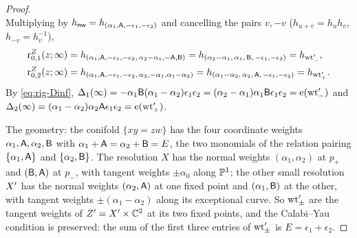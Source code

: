 \begin{proof}
\[\]
Multiplying by $h_{\mathsf{nw}}=h_{(\alpha_1,\mathsf{A},-\epsilon_1,-\epsilon_2)}$ and cancelling the pairs $v,-v$ ($h_{u+v}=h_uh_v$, $h_{-v}=h_v^{-1}$),
\begin{align*}
\mathrm{r}^{Z}_{0,1}(z;\infty)&=h_{(\alpha_1,\mathsf{A},-\epsilon_1,-\epsilon_2,\,\alpha_2-\alpha_1,-\mathsf{A},\mathsf{B})}=h_{(\alpha_2-\alpha_1,\,\alpha_1,\,\mathsf{B},\,-\epsilon_1,-\epsilon_2)}=h_{\mathrm{wt}'_-},\\
\mathrm{r}^{Z}_{0,2}(z;\infty)&=h_{(\alpha_1,\mathsf{A},-\epsilon_1,-\epsilon_2,\,\alpha_2,-\alpha_1,\alpha_1-\alpha_2)}=h_{(\alpha_1-\alpha_2,\,\alpha_2,\,\mathsf{A},\,-\epsilon_1,-\epsilon_2)}=h_{\mathrm{wt}'_+}.
\end{align*}
By \eqref{eq:rig-Dinf}, $\Delta_1(\infty)=-\alpha_1\mathsf{B}(\alpha_1-\alpha_2)\epsilon_1\epsilon_2=(\alpha_2-\alpha_1)\alpha_1\mathsf{B}\epsilon_1\epsilon_2=\mathrm{e}(\mathrm{wt}'_-)$ and $\Delta_2(\infty)=(\alpha_1-\alpha_2)\alpha_2\mathsf{A}\epsilon_1\epsilon_2=\mathrm{e}(\mathrm{wt}'_+)$.

The geometry: the conifold $\{xy=zw\}$ has the four coordinate weights $\alpha_1,\mathsf{A},\alpha_2,\mathsf{B}$ with $\alpha_1+\mathsf{A}=\alpha_2+\mathsf{B}=E$, the two monomials of the relation pairing $\{\alpha_1,\mathsf{A}\}$ and $\{\alpha_2,\mathsf{B}\}$. The resolution $X$ has the normal weights $(\alpha_1,\alpha_2)$ at $p_+$ and $(\mathsf{B},\mathsf{A})$ at $p_-$, with tangent weights $\pm\alpha_0$ along $\mathbb{P}^1$; the other small resolution $X'$ has the normal weights $(\alpha_2,\mathsf{A})$ at one fixed point and $(\alpha_1,\mathsf{B})$ at the other, with tangent weights $\pm(\alpha_1-\alpha_2)$ along its exceptional curve. So $\mathrm{wt}'_\pm$ are the tangent weights of $Z'=X'\times\mathbb{C}^2$ at its two fixed points, and the Calabi--Yau condition is preserved: the sum of the first three entries of $\mathrm{wt}'_\pm$ is $E=\epsilon_1+\epsilon_2$. 


\end{proof}
